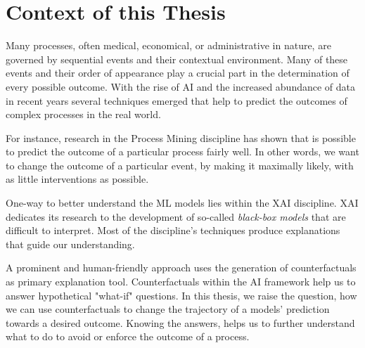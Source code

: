 \documentclass[./../../paper.tex]{subfiles}
\begin{document}
\section{Context of this Thesis}
Many processes, often medical, economical, or administrative in nature, are governed by sequential events and their contextual environment. Many of these events and their order of appearance play a crucial part in the determination of every possible outcome. With the rise of AI and the increased abundance of data in recent years several techniques emerged that help to predict the outcomes of complex processes in the real world.

For instance, research in the Process Mining discipline has shown that is possible to predict the outcome of a particular process fairly well\needscite{}.  In other words, we want to change the outcome of a particular event, by making it maximally likely, with as little interventions as possible. 

One-way to better understand the \gls{ML} models lies within the \gls{XAI} discipline. \gls{XAI} dedicates its research to the  development of so-called \emph{black-box models} that are  difficult to interpret. Most of the discipline's techniques produce explanations that guide our understanding.

A prominent and human-friendly approach uses the generation of counterfactuals as primary explanation tool. Counterfactuals within the AI framework help us to answer hypothetical "what-if" questions. In this thesis, we raise the question, how we can use counterfactuals to change the trajectory of a models' prediction towards a desired outcome.  
Knowing the answers, helps us to further understand what to do to avoid or enforce the outcome of a process.
\end{document}
